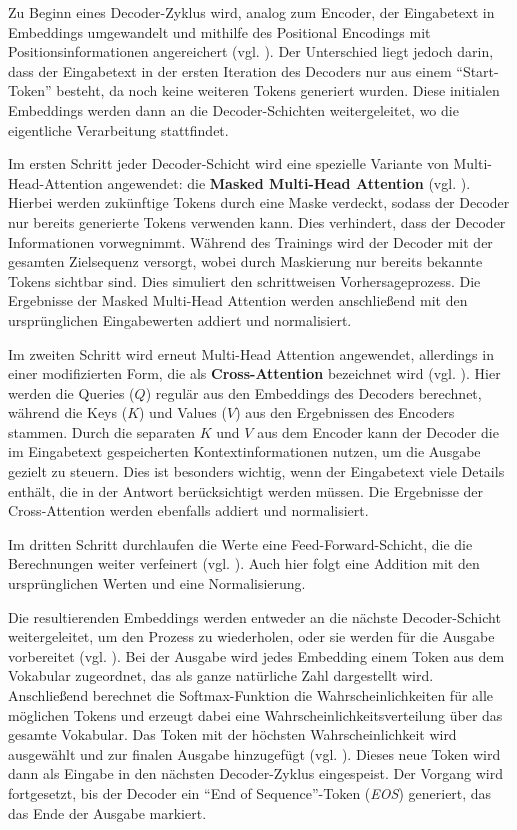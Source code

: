 Zu Beginn eines Decoder-Zyklus wird, analog zum Encoder, der Eingabetext in Embeddings umgewandelt und mithilfe des Positional Encodings mit Positionsinformationen angereichert  (vgl. \cite[S. 213]{paass.2020}). 
Der Unterschied liegt jedoch darin, dass der Eingabetext in der ersten Iteration des Decoders nur aus einem \enquote{Start-Token} besteht, da noch keine weiteren Tokens generiert wurden. 
Diese initialen Embeddings werden dann an die Decoder-Schichten weitergeleitet, wo die eigentliche Verarbeitung stattfindet.

Im ersten Schritt jeder Decoder-Schicht wird eine spezielle Variante von Multi-Head-Attention angewendet: die \textbf{Masked Multi-Head Attention} (vgl. \cite[S. 213]{paass.2020}). 
Hierbei werden zukünftige Tokens durch eine Maske verdeckt, sodass der Decoder nur bereits generierte Tokens verwenden kann. 
Dies verhindert, dass der Decoder Informationen vorwegnimmt.  
Während des Trainings wird der Decoder mit der gesamten Zielsequenz versorgt, wobei durch Maskierung nur bereits bekannte Tokens sichtbar sind. 
Dies simuliert den schrittweisen Vorhersageprozess.  
Die Ergebnisse der Masked Multi-Head Attention werden anschließend mit den ursprünglichen Eingabewerten addiert und normalisiert.

Im zweiten Schritt wird erneut Multi-Head Attention angewendet, allerdings in einer modifizierten Form, die als \textbf{Cross-Attention} bezeichnet wird (vgl. \cite[S. 212]{paass.2020}). 
Hier werden die Queries (\( Q \)) regulär aus den Embeddings des Decoders berechnet, während die Keys (\( K \)) und Values (\( V \)) aus den Ergebnissen des Encoders stammen. 
Durch die separaten \( K \) und \( V \) aus dem Encoder kann der Decoder die im Eingabetext gespeicherten Kontextinformationen nutzen, um die Ausgabe gezielt zu steuern. 
Dies ist besonders wichtig, wenn der Eingabetext viele Details enthält, die in der Antwort berücksichtigt werden müssen.  
Die Ergebnisse der Cross-Attention werden ebenfalls addiert und normalisiert.

Im dritten Schritt durchlaufen die Werte eine Feed-Forward-Schicht, die die Berechnungen weiter verfeinert (vgl. \cite[S. 3]{attention}). 
Auch hier folgt eine Addition mit den ursprünglichen Werten und eine Normalisierung.

Die resultierenden Embeddings werden entweder an die nächste Decoder-Schicht weitergeleitet, um den Prozess zu wiederholen, oder sie werden für die Ausgabe vorbereitet (vgl. \cite[S. 213]{paass.2020}). 
Bei der Ausgabe wird jedes Embedding einem Token aus dem Vokabular zugeordnet, das als ganze natürliche Zahl dargestellt wird. 
Anschließend berechnet die Softmax-Funktion die Wahrscheinlichkeiten für alle möglichen Tokens und erzeugt dabei eine Wahrscheinlichkeitsverteilung über das gesamte Vokabular. 
Das Token mit der höchsten Wahrscheinlichkeit wird ausgewählt und zur finalen Ausgabe hinzugefügt (vgl. \cite[S. 213]{paass.2020}). 
Dieses neue Token wird dann als Eingabe in den nächsten Decoder-Zyklus eingespeist. 
Der Vorgang wird fortgesetzt, bis der Decoder ein \enquote{End of Sequence}-Token (\textit{EOS}) generiert, das das Ende der Ausgabe markiert.



